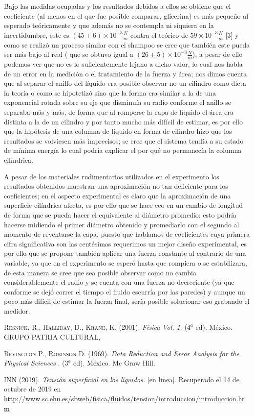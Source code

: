\documentclass[a4paper]{article}
\begin{document}
Bajo las medidas ocupadas y los resultados debidos a ellos se obtiene que el  coeficiente (al menos en el que fue posible comparar, glicerina) es más pequeño al esperado teóricamente y que además no se contempla ni siquiera en la incertidumbre, este es $(45\pm 6)\times10^{-3}  \frac{N}{m}$ contra el teórico de $59\times10^{-3} \frac{N}{m}$ [3] y como se realizó un proceso similar con el shampoo se cree que también este pueda ser más bajo al real ( que se obtuvo igual a $(26\pm 5)\times10^{-3}  \frac{N}{m}$), a pesar de ello podemos ver que no es lo suficientemente lejano a dicho valor, lo cual nos habla de un error en la medición o el tratamiento de la fuerza y área; nos dimos cuenta que al separar el anillo del líquido era posible observar no un cilindro como dicta la teoría o como se hipotetizó sino que la forma era similar a la de una exponencial rotada sobre su eje que disminuía su radio conforme el anillo se separaba más y más, de forma que al romperse la capa de líquido el área era distinta a la de un cilindro y por tanto mucho más difícil de estimar, es por ello que la hipótesis de una columna de líquido en forma de cilindro hizo que los resultados se volviesen más imprecisos; se cree que el sistema tendía a su estado de mínima energía lo cual podría explicar el por qué no permanecía la columna cilíndrica.

A pesar de los materiales rudimentarios utilizados en el experimento los resultados obtenidos muestran una aproximación no tan deficiente para los coeficientes; en el aspecto experimental es claro que la aproximación de una superficie cilíndrica afecta, es por ello que se hace eco en un cambio de longitud de forma que se pueda hacer el equivalente al diámetro promedio:  esto podría hacerse midiendo el primer diámetro obtenido y promediarlo con el segundo al momento de reventarse la capa, puesto que hablamos de coeficientes cuya primera cifra significativa son las centésimas requerimos un mejor diseño experimental, es por ello que se propone también aplicar una fuerza constante al contrario de una variable, ya que en el experimento se esperó hasta que rompiera o se estabilizara, de esta manera se cree que sea posible observar como no cambia considerablemente el radio y se cuenta con una fuerza no decreciente (ya que conforme se dejó correr el tiempo el fluido escurría por las paredes) y aunque un poco más difícil de estimar la fuerza final, sería posible solucionar eso grabando el medidor.


\begin{thebibliography}{a}
 \textsc{Resnick, R., Halliday, D., Krane, K.} (2001). \textit{Física Vol. 1}. ($4^a$ ed). México. GRUPO PATRIA CULTURAL,

 \textsc{Bevington P., Robinson D.} (1969). \textit{Data Reduction and Error Analysis for the Physical Sciences
}. ($3^a$ ed). México. Mc Graw Hill.

 \textsc{INN} (2019). \textit{Tensión superficial en los líquidos.} [en linea]. Recuperado el 14 de octubre de 2019 en \url{http://www.sc.ehu.es/sbweb/fisica/fluidos/tension/introduccion/introduccion.htm}


\end{thebibliography}
\end{document}
